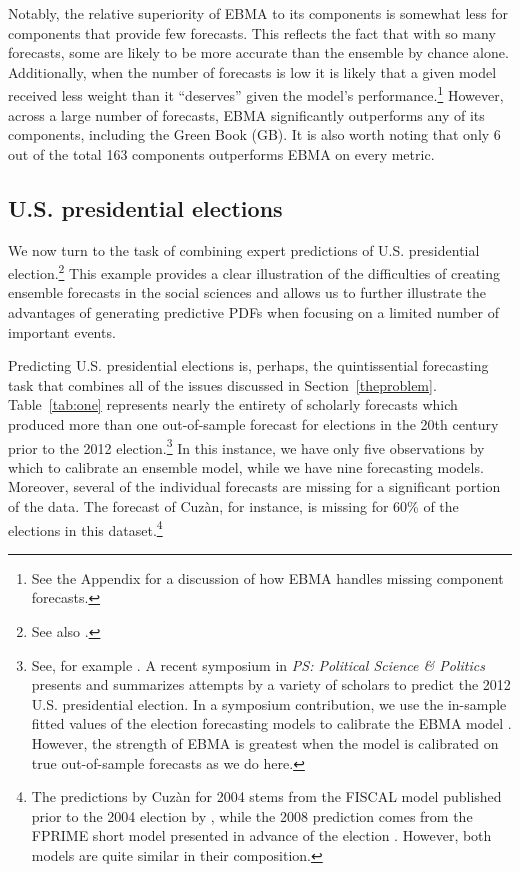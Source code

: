 \documentclass[12pt,fullpage,endnotes]{article}
\begin{document}
Notably, the relative superiority of EBMA to its components is
somewhat less for components that provide few forecasts.  This
reflects the fact that with so many forecasts, some are likely to be
more accurate than the ensemble by chance alone. Additionally, when
the number of forecasts is low it is likely that a given model
received less weight than it ``deserves'' given the model's
performance.\footnote{See the Appendix for a discussion of how EBMA
  handles missing component forecasts.}  However, across a large
  number of forecasts, EBMA significantly outperforms any of its
  components, including the Green Book (GB).  It is also worth noting
  that only 6 out of the total 163 components outperforms EBMA on
  every metric.




\subsection{U.S. presidential elections}

We now turn to the task of combining expert predictions of
U.S. presidential election.\footnote{See also \citep{Montgomery:2012c}.}
This example provides a clear illustration of the difficulties of
creating ensemble forecasts in the social sciences and allows us to
further illustrate the advantages of generating predictive PDFs when
focusing on a limited number of important events.

Predicting U.S. presidential elections is, perhaps, the quintissential
forecasting task that combines all of the issues discussed in
Section~\ref{theproblem}.  Table~\ref{tab:one} represents nearly the
entirety of scholarly forecasts which produced more than one
out-of-sample forecast for elections in the 20th century prior to the
2012 election.\footnote{ See, for example \citet[][]{Fair:2009,
    Fair2011, Abramowitz:2008, Campbell:2008,
    Cuzan:2004,Cuzan:Bundrick:2008,hibbs:2012, Lockerbie:2008,
    Erikson:Wlezien:2008, Graefe:2010, Holbrook:2008}.  A recent
  symposium in {\em PS: Political Science \& Politics} presents and
  summarizes attempts by a variety of scholars to predict the 2012
  U.S. presidential election. In a symposium contribution, we use the
  in-sample fitted values of the election forecasting models to
  calibrate the EBMA model \citep{Montgomery:2012c}. However, the
  strength of EBMA is greatest when the model is calibrated on true
  out-of-sample forecasts as we do here.}  In this instance, we have
only five observations by which to calibrate an ensemble model, while
we have nine forecasting models.  Moreover, several of the individual
forecasts are missing for a significant portion of the data.  The
forecast of Cuz\`an, for instance, is missing for 60\% of the
elections in this dataset.\footnote{The predictions by Cuz\`an for
  2004 stems from the FISCAL model published prior to the 2004
  election by \citet{Cuzan:2004}, while the 2008 prediction comes from
  the FPRIME short model presented in advance of the election
  \citep{Cuzan:Bundrick:2008}. However, both models are quite similar
  in their composition.}
\end{document}
